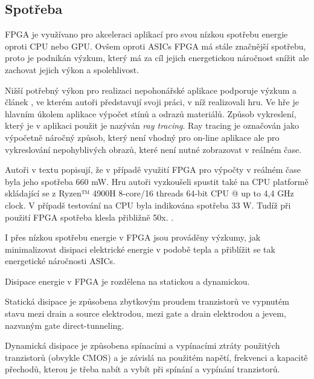 \documentclass[a4paper, twoside, 11pt]{article}
\newcommand{\fbar}{\FloatBarrier}
\begin{document}
		\fbar
		\subsection{Spotřeba}
			FPGA je využívano pro akceleraci aplikací pro svou nízkou spotřebu energie oproti CPU nebo GPU. Ovšem oproti ASICs FPGA má stále značnější spotřebu, proto je podnikán výzkum, který má za cíl jejich energetickou náročnost snížit ale zachovat jejich výkon a spolehlivost.\par
			Nižší potřebný výkon pro realizaci nepohonářské aplikace podporuje výzkum a článek \cite{rovere-sphery-vs-shapes}, ve kterém autoři představují svoji práci, v níž realizovali hru. Ve hře je hlavním úkolem aplikace výpočet stínů a odrazů materiálů. Způsob vykreslení, který je v aplikaci použit je nazýván \textit{ray tracing}. Ray tracing je označován jako výpočetně náročný způsob, který není vhodný pro on-line aplikace ale pro vykreslování nepohyblivých obrazů, které není nutné zobrazovat v reálném čase. \cite{wikipedia-ray-tracing}\par
			Autoři v textu popisují, že v případě využití FPGA pro výpočty v reálném čase byla jeho spotřeba 660 mW. Hru autoři vyzkoušeli spustit také na CPU platformě skládající se z Ryzen™️ 4900H 8-core/16 threads 64-bit CPU @ up to 4,4 GHz clock. V případš testování na CPU byla indikována spotřeba 33 W. Tudíž při použití FPGA spotřeba klesla přibližně 50x. \cite{rovere-sphery-vs-shapes}.\par
			I přes nízkou spotřebu energie v FPGA jsou prováděny výzkumy, jak minimalizovat disipaci elektrické energie v podobě tepla a přiblížit se tak energetické náročnosti ASICs.\par
			Disipace energie v FPGA je rozdělena na statickou a dynamickou.\par
			Statická disipace je způsobena zbytkovým proudem tranzistorů ve vypnutém stavu mezi drain a source elektrodou, mezi gate a drain elektrodou a jevem, nazvaným gate direct-tunneling. \cite{grover-reduction-of-power-consumption}\par
			Dynamická disipace je způsobena spínacími a vypínacími ztráty použitých tranzistorů (obvykle CMOS) a je závislá na použitém napětí, frekvenci a kapacitě přechodů, kterou je třeba nabít a vybít při spínání a vypínání tranzistorů. \cite{grover-reduction-of-power-consumption}
\end{document}
